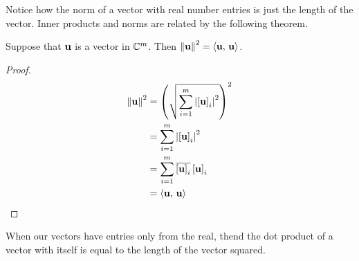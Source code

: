 \documentclass{ximera}
\begin{document}
Notice how the norm of a vector with real number entries is just the
length of the vector.  Inner products and norms are related by the
following theorem.

\begin{theorem}
\label{theorem:IPN}

Suppose that $\mathbf{u}$ is a vector in $\mathbb{C}^{m}$.  Then
$\left\lVert\mathbf{u}\right\rVert^2=\left\langle\mathbf{u},\,\mathbf{u}\right\rangle$.

\begin{proof}

  \begin{align*}
    \left\lVert\mathbf{u}\right\rVert^2
    &=\left(\sqrt{\sum_{i=1}^{m}\left\lvert\left\lbrack\mathbf{u}\right\rbrack_{i}\right\rvert^2}\right)^2
    \\ 
    &=\sum_{i=1}^{m}\left\lvert\left\lbrack\mathbf{u}\right\rbrack_{i}\right\rvert^2
    \\ 
    &=\sum_{i=1}^{m}\overline{\left\lbrack\mathbf{u}\right\rbrack_{i}}\left\lbrack\mathbf{u}\right\rbrack_{i}
    \\ 
    &=\left\langle\mathbf{u},\,\mathbf{u}\right\rangle
    \\ 
  \end{align*}

\end{proof}
\end{theorem}

When our vectors have entries only from the real, thend the dot
product of a vector with itself is equal to the length of the vector
squared.
\end{document}
